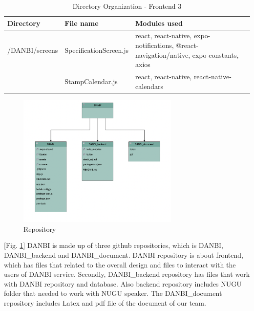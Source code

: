\documentclass[conference]{IEEEtran}
\begin{document}
\begin{table}[h!]

\begin{threeparttable}
    \caption{Directory Organization - Frontend 3%
    \label{tab:table5}}    %
    \begin{tabular}{p{2.4cm}p{2.8cm}p{2cm}}
    \toprule
    \bfseries Directory & \bfseries File name & \multicolumn{1}{l}{\bfseries Modules used} \\
    \midrule
        /DANBI/screens
        & SpecificationScreen.js& react, react-native, expo-notifications, @react-navigation/native, expo-constants, axios\\
        & StampCalendar.js& react, react-native, react-native-calendars\\

    \bottomrule
    \end{tabular}
\end{threeparttable}
\end{table}


\par \begin{figure}[h!]
\includegraphics[width=8cm]{image/repo.png}
\centering
\caption{Repository}
\label{fig:repo}
\end{figure}

[Fig. \ref{fig:repo}] DANBI is made up of three github repositories, which is DANBI, DANBI\_backend and DANBI\_document. DANBI repository is about frontend, which has files that related to the overall design and files to interact with the users of DANBI service. Secondly, DANBI\_backend repository has files that work with DANBI repository and database. Also backend repository includes NUGU folder that needed to work with NUGU speaker. The DANBI\_document repository includes Latex and pdf file of the document of our team.
\end{document}
